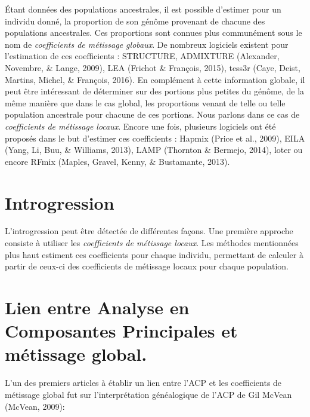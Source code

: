 \documentclass[12pt,twoside]{reedthesis}
\begin{document}
  Étant données des populations ancestrales, il est possible d'estimer
  pour un individu donné, la proportion de son génôme provenant de chacune
  des populations ancestrales. Ces proportions sont connues plus
  communément sous le nom de \emph{coefficients de métissage globaux}. De
  nombreux logiciels existent pour l'estimation de ces coefficients :
  STRUCTURE, ADMIXTURE (Alexander, Novembre, \& Lange, 2009), LEA (Frichot
  \& François, 2015), tess3r (Caye, Deist, Martins, Michel, \& François,
  2016). En complément à cette information globale, il peut être
  intéressant de déterminer sur des portions plus petites du génôme, de la
  même manière que dans le cas global, les proportions venant de telle ou
  telle population ancestrale pour chacune de ces portions. Nous parlons
  dans ce cas de \emph{coefficients de métissage locaux}. Encore une fois,
  plusieurs logiciels ont été proposés dans le but d'estimer ces
  coefficients : Hapmix (Price et al., 2009), EILA (Yang, Li, Buu, \&
  Williams, 2013), LAMP (Thornton \& Bermejo, 2014), loter ou encore RFmix
  (Maples, Gravel, Kenny, \& Bustamante, 2013).
  
  \section{Introgression}\label{introgression}
  
  L'introgression peut être détectée de différentes façons. Une première
  approche consiste à utiliser les \emph{coefficients de métissage
  locaux}. Les méthodes mentionnées plus haut estiment ces coefficients
  pour chaque individu, permettant de calculer à partir de ceux-ci des
  coefficients de métissage locaux pour chaque population.
  
  \section{Lien entre Analyse en Composantes Principales et métissage
  global.}\label{lien-entre-analyse-en-composantes-principales-et-metissage-global.}
  
  L'un des premiers articles à établir un lien entre l'ACP et les
  coefficients de métissage global fut sur l'interprétation généalogique
  de l'ACP de Gil McVean (McVean, 2009):
  
\end{document}

